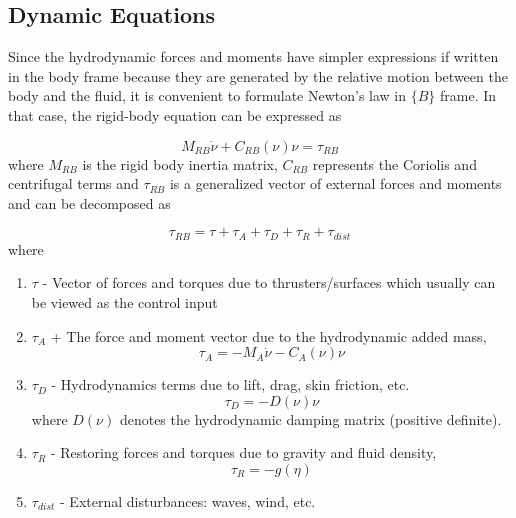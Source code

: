 \subsection{Dynamic Equations}

Since the hydrodynamic forces and moments have simpler expressions if written in the body frame because they are generated by the relative motion between the body and the fluid, it is convenient to formulate Newton’s law in $\{B\}$ frame. In that case, the rigid-body equation can be expressed as

\begin{equation}
    M_{RB}\dot{\nu} + C_{RB}(\nu)\nu = \tau_{RB}
    \label{eq:rigid_body}
\end{equation}
where $M_{RB}$ is the rigid body inertia matrix, $C_{RB}$ represents the Coriolis and centrifugal terms and $\tau_{RB}$ is a generalized vector of external forces and moments and can be decomposed as
 
\begin{equation}
    \tau_{RB} = \tau + \tau_A + \tau_D + \tau_R + \tau_{dist}
    \label{eq:tau_rb}
\end{equation}
where
\begin{enumerate}
    \item $\tau$ - Vector of forces and torques due to thrusters/surfaces which usually can be viewed as the control input
    \item $\tau_A$ + The force and moment vector due to the hydrodynamic added mass,
    \begin{equation}
        \tau_A = - M_A \dot{\nu} - C_A(\nu)\nu
        \label{eq:tau_a}
    \end{equation}
    \item $\tau_D$ - Hydrodynamics terms due to lift, drag, skin friction, etc.
    \begin{equation}
        \tau_D = - D(\nu)\nu
        \label{eq:tau_d}
    \end{equation}
    where $D(\nu)$ denotes the hydrodynamic damping matrix (positive definite).
    \item $\tau_R$ - Restoring forces and torques due to gravity and fluid density,
    \begin{equation}
        \tau_R = -g(\eta)
        \label{eq:tau_r}
    \end{equation}
    \item $\tau_{dist}$ - External disturbances: waves, wind, etc.
\end{enumerate}

